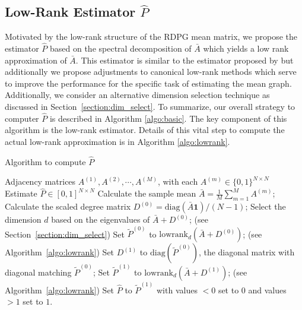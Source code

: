 \documentclass[10pt,letterpaper]{article}
\renewcommand{\hat}{\widehat}
\begin{document}
\subsection[Low-Rank Estimator]{Low-Rank Estimator $\hat{P}$}
\label{sec:phat}

Motivated by the low-rank structure of the RDPG mean matrix, we propose the estimator $\hat{P}$ based on the spectral decomposition of $\bar{A}$ which yields a low rank approximation of $\bar{A}$.
This estimator is similar to the estimator proposed by \citet{chatterjee2015matrix} but additionally
we propose adjustments to canonical low-rank methods which serve to improve the performance for the specific task of estimating the mean graph. 
Additionally, we consider an alternative dimension selection technique as discussed in Section~\ref{section:dim_select}.
To summarize, our overall strategy to computer $\hat{P}$ is described in Algorithm \ref{algo:basic}. The key component of this algorithm is the low-rank estimator. Details of this vital step to compute the actual low-rank approximation is in Algorithm \ref{algo:lowrank}.

\begin{algorithm}[H]
\caption{Algorithm to compute $\hat{P}$}
\label{algo:basic}
\begin{algorithmic}[1]
\REQUIRE Adjacency matrices $A^{(1)}, A^{(2)}, \cdots, A^{(M)}$, with each $A^{(m)} \in \{0,1\}^{N \times N}$
\ENSURE Estimate $\hat{P}\in[0,1]^{N\times N}$
\STATE Calculate the sample mean $\bar{A} = \frac{1}{M}\sum\limits_{m = 1}^M A^{(m)}$;
\STATE Calculate the scaled degree matrix $D^{(0)} = \mathrm{diag}(\bar{A} \bm{1})/(N-1)$;
\STATE Select the dimension $d$ based on the eigenvalues of $\bar{A} + D^{(0)}$; (see Section~\ref{section:dim_select})
\STATE Set $\tilde{P}^{(0)}$ to $\mathrm{lowrank}_d(\bar{A} + D^{(0)})$; (see Algorithm~\ref{algo:lowrank})
\STATE Set $D^{(1)}$ to $ \mathrm{diag}(\tilde{P}^{(0)})$, the diagonal matrix with diagonal matching $\tilde{P}^{(0)}$; 
\STATE Set $\tilde{P}^{(1)}$ to $\mathrm{lowrank}_d(\bar{A} + D^{(1)})$; (see Algorithm~\ref{algo:lowrank})
\STATE Set $\hat{P}$ to $\tilde{P}^{(1)}$ with values $<0$ set to $0$ and values $>1$ set to $1$.
\end{algorithmic}
\end{algorithm}
\end{document}
